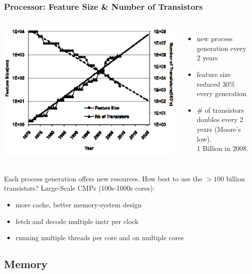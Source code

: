 \documentclass{beamer}
\newcommand{\emp}[1]{\textcolor{DikuRed}{ #1}}
\begin{document}
\begin{frame}[fragile,t]
\frametitle{Processor: Feature Size \& Number of Transistors}

\begin{columns}
\includegraphics[width=47ex]{Ch1Figs/FeatureSize}
        \begin{itemize}
            \item new process generation every 2 years\smallskip
                
            \item feature size reduced $30\%$ every generation

            \item \# of transistors doubles every 2 years (Moore's low).\\
                    1 Billion in 2008. 
        \end  {itemize}
\end{columns}
\vspace{-2ex}

Each process generation offers new resources.
\emp{How best to use the $>100$ billion transistors? Large-Scale CMPs (100s-1000s cores)}:
\begin{itemize}
    \item more cache, better memory-system design
    \item fetch and decode multiple instr per clock
    \item running multiple threads per core and on multiple cores
\end  {itemize} 

\end{frame}

\subsection{Memory}
\end{document}

